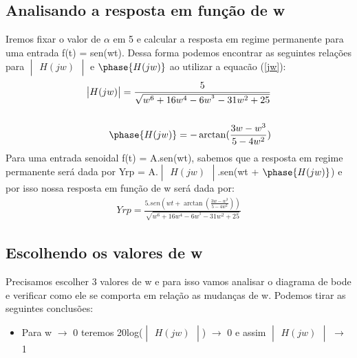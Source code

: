\documentclass[a4paper,12pt,twoside]{article}
\begin{document}
\subsection{Analisando a resposta em função de w}
Iremos fixar o valor de $\alpha$ em 5 e calcular a resposta em regime permanente para uma entrada f(t) = sen(wt). Dessa forma podemos encontrar as seguintes relações para  $\begin{vmatrix}H(jw)\end{vmatrix}$ e $\phase{H(jw)}$ ao utilizar a equacão (\ref{jw}):
\begin{equation}
\begin{split}
\begin{vmatrix} H(jw)
\end{vmatrix}= \frac{5}{\sqrt{w^{6} + 16w^{4} -6w^{^{3}} - 31w^{2} +25}}
\\ \\ 
\phase{H(jw)} = -\arctan (\frac{3w-w^{3}}{5-4w^{2}})
\\
\end{split}
\end{equation}
Para uma entrada senoidal f(t) = A.sen(wt), sabemos que a resposta em regime permanente será dada por Yrp = A.$\begin{vmatrix}H(jw)\end{vmatrix}$.sen(wt + $\phase{H(jw)}$) e por isso nossa resposta em função de w será dada por:
\begin{equation}
\begin{split}
Yrp = \frac{5.sen(wt + \arctan (\frac{3w-w^{3}}{5-4w^{2}}))}{\sqrt{w^{6} + 16w^{4} -6w^{^{3}} - 31w^{2} +25}}
\end{split}
\end{equation}

\subsection{Escolhendo os valores de w}

Precisamos escolher 3 valores de w e para isso vamos analisar o diagrama de bode e verificar como ele se comporta em relação as mudanças de w. Podemos tirar as seguintes conclusões:
\begin{itemize}
    \item Para w $\to$ 0 teremos 20log($\begin{vmatrix}H(jw)\end{vmatrix}$) $\to$ 0 e assim $\begin{vmatrix}H(jw)\end{vmatrix}$ $\to$ 1
\end{itemize}
\end{document}
